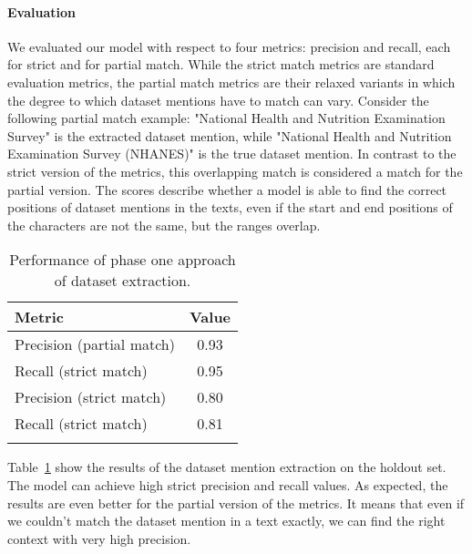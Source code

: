 \paragraph{Evaluation}
We evaluated our model with respect to four metrics: precision and recall, each for strict and for partial match.
While the strict match metrics are standard evaluation metrics, the partial match metrics are their relaxed variants in which the degree to which dataset mentions have to match can vary. 
Consider the following partial match example: "National Health and Nutrition Examination Survey" is the extracted dataset mention, while "National Health and Nutrition Examination Survey (NHANES)" is the true dataset mention. 
In contrast to the strict version of the metrics, this overlapping match is considered a match for the partial version.
The scores describe whether a model is able to find the correct positions of dataset mentions in the texts, even if the start and end positions of the characters are not the same, but the ranges overlap.
\begin{table}[b]
    \center 
    \caption{Performance of phase one approach of dataset extraction. } 
    \begin{tabular}{lc} 
        \toprule
        Metric  & Value \\
        \midrule
        Precision (partial match)   & 0.93 \\
        Recall (strict match)      & 0.95 \\
        \midrule
        Precision (strict match)    & 0.80 \\
        Recall (strict match)       & 0.81 \\ 
        \bottomrule \\ 
    \end{tabular} 
    \label{table:dataset-mention-eval} 
\end{table}

Table~\ref{table:dataset-mention-eval} show the results of the dataset mention extraction on the holdout set. The model can achieve high strict precision and recall values. As expected, the results are even better for the partial version of the metrics. It means that even if we couldn't match the dataset mention in a text exactly, we can find the right context with very high precision.

